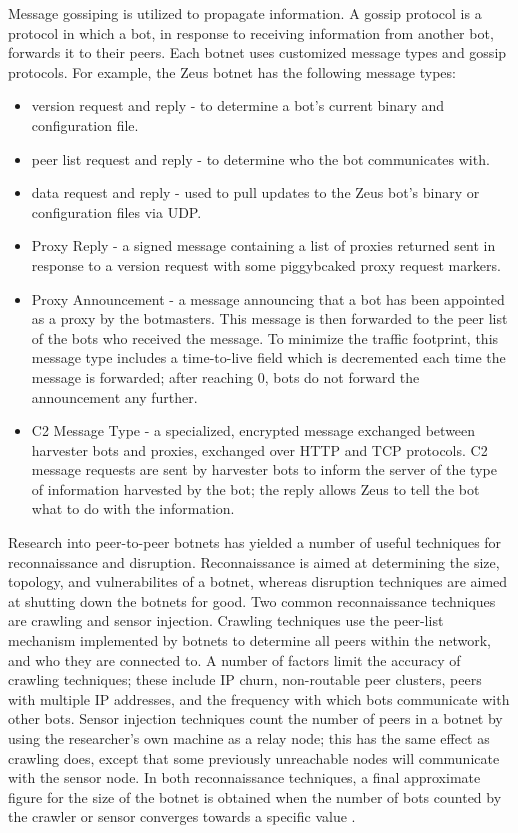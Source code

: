 \documentclass{acm_proc_article-sp}
\begin{document}
Message gossiping is utilized to propagate information\cite{stone:p2p}. A gossip protocol is a protocol in which a bot, in response to receiving information from another bot, forwards it to their peers. Each botnet uses customized message types and gossip protocols. For example, the Zeus botnet has the following message types:\cite{zeus:protocol}
\begin{itemize}
\item version request and reply - to determine a bot’s current binary and configuration file\cite{zeus:protocol}.
\item peer list request and reply - to determine who the bot communicates with\cite{zeus:protocol}.
\item data request and reply - used to pull updates to the Zeus bot's binary or configuration files via UDP\cite{zeus:protocol}.
\item Proxy Reply - a signed message containing a list of proxies returned sent in response to a version request with some piggybcaked proxy request markers\cite{zeus:protocol}.
\item Proxy Announcement - a message announcing that a bot has been appointed as a proxy by the botmasters.  This message is then forwarded to the peer list of the bots who received the message.  To minimize the traffic footprint, this message type includes a time-to-live field which is decremented each time the message is forwarded; after reaching 0, bots do not forward the announcement any further\cite{zeus:protocol}.
\item C2 Message Type - a specialized, encrypted message exchanged between harvester bots and proxies, exchanged over HTTP and TCP protocols.  C2 message requests are sent by harvester bots to inform the server of the type of information harvested by the bot; the reply allows Zeus to tell the bot what to do with the information\cite{zeus:protocol}.
\end{itemize}

Research into peer-to-peer botnets has yielded a number of useful techniques for reconnaissance and disruption.  Reconnaissance is aimed at determining the size, topology, and vulnerabilites of a botnet, whereas disruption techniques are aimed at shutting down the botnets for good.  Two common reconnaissance techniques are crawling and sensor injection.  Crawling techniques use the peer-list mechanism implemented by botnets to determine all peers within the network, and who they are connected to. A number of factors limit the accuracy of crawling techniques; these include IP churn, non-routable peer clusters, peers with multiple IP addresses, and the frequency with which bots communicate with other bots.  Sensor injection techniques count the number of peers in a botnet by using the researcher’s own machine as a relay node; this has the same effect as crawling does, except that some previously unreachable nodes will communicate with the sensor node.  In both reconnaissance techniques, a final approximate figure for the size of the botnet is obtained when the number of bots counted by the crawler or sensor converges towards a specific value \cite{stone:p2p}\cite{defcon:prowling}.
\end{document}
